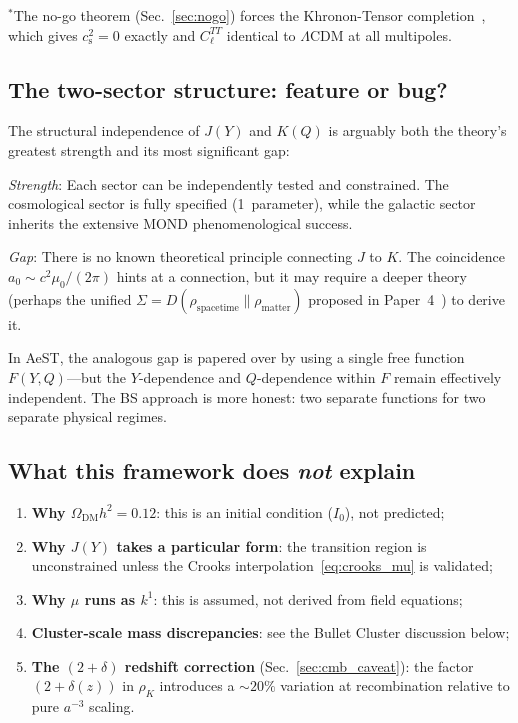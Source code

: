 \documentclass[prd,twocolumn,superscriptaddress,longbibliography,floatfix]{revtex4-2}
\newcommand{\cs}{c_{\mathrm{s}}}
\begin{document}
$^*$The no-go theorem (Sec.~\ref{sec:nogo}) forces the Khronon-Tensor
completion~\cite{BS2025}, which gives $\cs^2 = 0$ exactly and
$C_\ell^{TT}$ identical to $\Lambda$CDM at all multipoles.

\subsection{The two-sector structure: feature or bug?}

The structural independence of $J(Y)$ and $K(Q)$ is arguably
both the theory's greatest strength and its most significant
gap:

\emph{Strength}: Each sector can be independently tested and
constrained.  The cosmological sector is fully specified
(1~parameter), while the galactic sector inherits the extensive
MOND phenomenological success.

\emph{Gap}: There is no known theoretical principle connecting
$J$ to $K$.  The coincidence $a_0 \sim c^2\mu_0/(2\pi)$
hints at a connection, but it may require a deeper theory
(perhaps the unified $\Sigma = D(\rho_{\mathrm{spacetime}} \|
\rho_{\mathrm{matter}})$ proposed in Paper~4~\cite{Paper4})
to derive it.

In AeST, the analogous gap is papered over by using a single
free function $F(Y,Q)$---but the $Y$-dependence and
$Q$-dependence within $F$ remain effectively independent.
The BS approach is more honest: two separate functions for
two separate physical regimes.

\subsection{What this framework does \emph{not} explain}

\begin{enumerate}
\item \textbf{Why $\Omega_{\mathrm{DM}}h^2 = 0.12$}: this is
  an initial condition ($I_0$), not predicted;
\item \textbf{Why $J(Y)$ takes a particular form}: the transition
  region is unconstrained unless the Crooks
  interpolation~\eqref{eq:crooks_mu} is validated;
\item \textbf{Why $\mu$ runs as $k^1$}: this is assumed, not
  derived from field equations;
\item \textbf{Cluster-scale mass discrepancies}: see the Bullet
  Cluster discussion below;
\item \textbf{The $(2{+}\delta)$ redshift correction}
  (Sec.~\ref{sec:cmb_caveat}): the factor $(2{+}\delta(z))$ in
  $\rho_K$ introduces a $\sim\!20\%$ variation at recombination
  relative to pure $a^{-3}$ scaling.
\end{enumerate}
\end{document}
